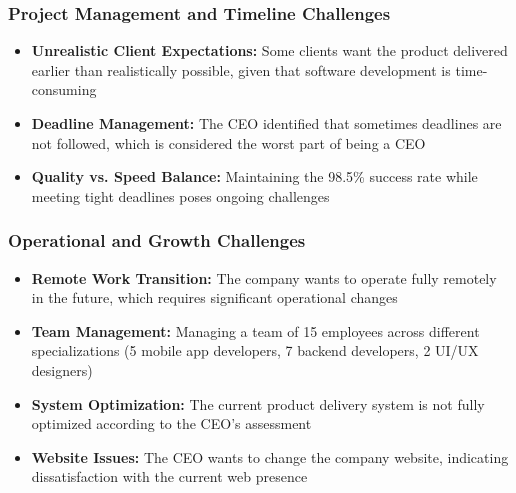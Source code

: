 \documentclass[12pt,a4paper]{article}
\begin{document}
\subsubsection{Project Management and Timeline Challenges}
\begin{itemize}
    \item \textbf{Unrealistic Client Expectations:} Some clients want the product delivered earlier than realistically possible, given that software development is time-consuming
    \item \textbf{Deadline Management:} The CEO identified that sometimes deadlines are not followed, which is considered the worst part of being a CEO
    \item \textbf{Quality vs. Speed Balance:} Maintaining the 98.5\% success rate while meeting tight deadlines poses ongoing challenges
\end{itemize}

\subsubsection{Operational and Growth Challenges}
\begin{itemize}
    \item \textbf{Remote Work Transition:} The company wants to operate fully remotely in the future, which requires significant operational changes
    \item \textbf{Team Management:} Managing a team of 15 employees across different specializations (5 mobile app developers, 7 backend developers, 2 UI/UX designers)
    \item \textbf{System Optimization:} The current product delivery system is not fully optimized according to the CEO's assessment
    \item \textbf{Website Issues:} The CEO wants to change the company website, indicating dissatisfaction with the current web presence
\end{itemize}
\end{document}
